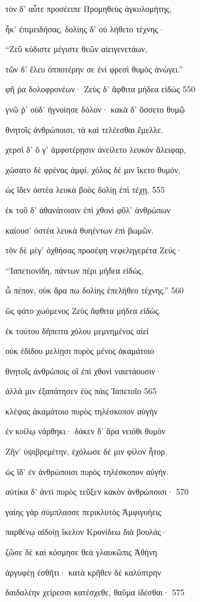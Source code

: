 τὸν δ' αὖτε προσέειπε Προμηθεὺς ἀγκυλομήτης,

ἦκ' ἐπιμειδήσας, δολίης δ' οὐ λήθετο τέχνης· 

``Ζεῦ κύδιστε μέγιστε θεῶν αἰειγενετάων, 

τῶν δ' ἕλευ ὁπποτέρην σε ἐνὶ φρεσὶ θυμὸς ἀνώγει.'' 

φῆ ῥα δολοφρονέων· Ζεὺς δ' ἄφθιτα μήδεα εἰδὼς \num{550} 

γνῶ ῥ' οὐδ' ἠγνοίησε δόλον· κακὰ δ' ὄσσετο θυμῷ 

θνητοῖς ἀνθρώποισι, τὰ καὶ τελέεσθαι ἔμελλε.

χερσὶ δ' ὅ γ' ἀμφοτέρῃσιν ἀνείλετο λευκὸν ἄλειφαρ, 

χώσατο δὲ φρένας ἀμφί, χόλος δέ μιν ἵκετο θυμόν,

ὡς ἴδεν ὀστέα λευκὰ βοὸς δολίῃ ἐπὶ τέχῃ. \num{555}

ἐκ τοῦ δ' ἀθανάτοισιν ἐπὶ χθονὶ φῦλ' ἀνθρώπων

καίουσ' ὀστέα λευκὰ θυηέντων ἐπὶ βωμῶν. 

τὸν δὲ μέγ' ὀχθήσας προσέφη νεφεληγερέτα Ζεύς· 

``Ἰαπετιονίδη, πάντων πέρι μήδεα εἰδώς, 

ὦ πέπον, οὐκ ἄρα πω δολίης ἐπελήθεο τέχνης.'' \num{560} 

ὣς φάτο χωόμενος Ζεὺς ἄφθιτα μήδεα εἰδώς. 

ἐκ τούτου δἤπειτα χόλου μεμνημένος αἰεὶ 

οὐκ ἐδίδου μελίῃσι πυρὸς μένος ἀκαμάτοιο

θνητοῖς ἀνθρώποις οἳ ἐπὶ χθονὶ ναιετάουσιν· 

ἀλλά μιν ἐξαπάτησεν ἐὺς πάις Ἰαπετοῖο \num{565}

κλέψας ἀκαμάτοιο πυρὸς τηλέσκοπον αὐγὴν

ἐν κοίλῳ νάρθηκι· δάκεν δ' ἄρα νειόθι θυμὸν

Ζῆν' ὑψιβρεμέτην, ἐχόλωσε δέ μιν φίλον ἦτορ,

ὡς ἴδ' ἐν ἀνθρώποισι πυρὸς τηλέσκοπον αὐγήν.

αὐτίκα δ' ἀντὶ πυρὸς τεῦξεν κακὸν ἀνθρώποισι· \num{570} 

γαίης γὰρ σύμπλασσε περικλυτὸς Ἀμφιγυήεις

παρθένῳ αἰδοίῃ ἴκελον Κρονίδεω διὰ βουλάς· 

ζῶσε δὲ καὶ κόσμησε θεὰ γλαυκῶπις Ἀθήνη

ἀργυφέῃ ἐσθῆτι· κατὰ κρῆθεν δὲ καλύπτρην 

δαιδαλέην χείρεσσι κατέσχεθε, θαῦμα ἰδέσθαι· \num{575} 

